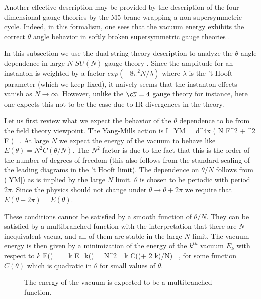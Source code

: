 Another effective description may be provided by the description of
the four dimensional gauge theories by the M5 brane wrapping a non
supersymmetric cycle.  Indeed, in this formalism, one sees that the
vacuum energy exhibits the correct $\theta$ angle behavior in softly
broken supersymmetric gauge theories \cite{Oz:1998ba}.

In this subsection we use the dual string theory description to
analyze the $\theta$ angle dependence in large $N$ $SU(N)$ gauge
theory \cite{Witten:1998td}.  Since the amplitude for an instanton is
weighted by a factor $exp(-8 \pi^2 N/ \lambda)$ where $\lambda$ is the
't Hooft parameter (which we keep fixed), it naively seems that the
instanton effects vanish as $N\rightarrow \infty$.  However, unlike
the $\cN=4$ gauge theory for instance, here one expects this not to be
the case due to IR divergences in the theory.

Let us first review what we expect the behavior of the $\theta$
dependence to be from the field theory viewpoint.
The Yang-Mills action is
\beq 
I_{YM} = \int d^4x \tr( {N  \lambda} F^2 + {\theta
{} \pi^2} F  ) \ .
\label{YM}
\eeq
At large $N$ we expect the energy of the vacuum 
to behave like
$E(\theta) = N^2 C(\theta/N)$.
The $N^2$ factor is due to the fact that this is the order of the number
of degrees of freedom (this also follows from the standard scaling of
the leading diagrams in the 't Hooft limit).
The dependence on $\theta/N$ follows from (\ref{YM}) 
as is implied by the large $N$ limit.
$\theta$ is chosen to be periodic with period $2 \pi$. Since the physics
should not change under 
$\theta \rightarrow \theta + 2 \pi$ we require
that 
$E(\theta + 2 \pi ) = E(\theta)$.

These conditions cannot be satisfied by a smooth function
of $\theta/N$. They can be satisfied by a multibranched function with 
the interpretation 
that there are $N$ inequivalent
vacua, and all of them are stable in the large $N$ limit.
The vacuum energy is then given by a minimization of 
the energy of the $k^{th}$ vacuum $E_k$
with respect 
to $k$
\beq
E(\theta) =  \min_k E_k(\theta) =  N^2 \min_k C((\theta+ 2 \pi k)/N) \ ,
\eeq
for some function $C(\theta)$ which is quadratic in $\theta$ for small
values of $\theta$.

\begin{figure}[htb]
\begin{center}
\epsfxsize=4in\leavevmode{}
\end{center}
\caption{The energy of the vacuum is expected to be a multibranched function.
}
\label{theta}
\end{figure} 


